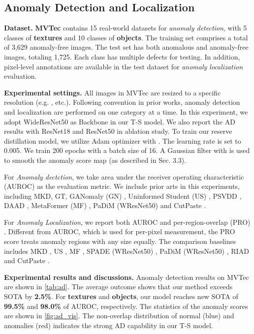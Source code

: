 \documentclass[10pt,twocolumn,letterpaper]{article}
\begin{document}
\subsection{Anomaly Detection and Localization}
\textbf{Dataset.} {\bf MVTec} \cite{mvtec} contains 15 real-world datasets for \emph{anomaly detection}, with 5 classes of {\bf textures} and 10 classes of {\bf objects}. The training set comprises a total of 3,629 anomaly-free images. The test set has both anomalous and anomaly-free images, totaling 1,725. Each class has multiple defects for testing. In addition, pixel-level annotations are available in the test dataset for \emph{anomaly localization} evaluation.

\textbf{Experimental settings.} All images in MVTec are resized to a specific resolution (e.g. ,  etc.). Following convention in prior works, anomaly detection and localization are performed on one category at a time. In this experiment, we adopt WideResNet50 as Backbone  in our T-S model. We also report the AD results with ResNet18 and ResNet50 in ablation study. To train our reserve distillation model, we utilize Adam optimizer \cite{adam} with . The learning rate is set to 0.005. We train 200 epochs with a batch size of 16. A Gaussian filter with  is used to smooth the anomaly score map (as described in Sec. 3.3). 

For \emph{Anomaly dectction}, we take area under the receiver operating characteristic (AUROC) as the evaluation metric. We include prior arts in this experiments, including MKD\cite{mkd}, GT\cite{gt}, GANomaly (GN) \cite{gn}, Uninformed Student (US) \cite{us}, PSVDD \cite{psvdd}, DAAD \cite{daad}, MetaFormer (MF) \cite{mf}, PaDiM (WResNet50) \cite{padim} and CutPaste \cite{cutpaste}.

For \emph{Anomaly Localization}, we report both AUROC and per-region-overlap (PRO) \cite{us}. Different from AUROC, which is used for per-pixel measurement, the PRO score treats anomaly regions with any size equally. The comparison baselines includes MKD \cite{mkd}, US \cite{us}, MF \cite{mf}, SPADE (WResNet50) \cite{spade,panda}, PaDiM (WResNet50) \cite{padim}, RIAD \cite{riad} and CutPaste \cite{cutpaste}. 

\textbf{Experimental results and discussions.}
Anomaly detection results on MVTec are shown in \cref{tab:ad}. The average outcome shows that our method exceeds SOTA by \textbf{2.5\%}. For {\bf textures} and {\bf objects}, our model reaches new SOTA of \textbf{99.5\%} and \textbf{98.0\%} of AUROC, respectively. The statistics of the anomaly scores are shown in \cref{fig:ad_vis}. The non-overlap distribution of normal (blue) and anomalies (red) indicates the strong AD capability in our T-S model.
\end{document}
